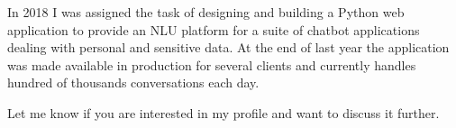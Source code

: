 \documentclass[11pt, a4paper]{awesome-cv}
\begin{document}
\begin{cvletter}
In 2018 I was assigned the task of designing and building a Python web application to provide an NLU platform for a suite of chatbot applications dealing with personal and sensitive data. At the end of last year the application was made available in production for several clients and currently handles hundred of thousands conversations each day.

Let me know if you are interested in my profile and want to discuss it further.

\end{cvletter}


\makeletterclosing
\end{document}
